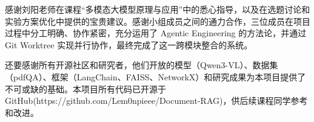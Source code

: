 
\begin{acknowledgements}

感谢刘阳老师在课程``多模态大模型原理与应用''中的悉心指导，以及在选题讨论和实验方案优化中提供的宝贵建议。感谢小组成员之间的通力合作，三位成员在项目过程中分工明确、协作紧密，充分运用了 Agentic Engineering 的方法论，并通过 Git Worktree 实现并行协作，最终完成了这一跨模块整合的系统。

还要感谢所有开源社区和研究者，他们开放的模型（Qwen3-VL）、数据集（pdfQA）、框架（LangChain、FAISS、NetworkX）和研究成果为本项目提供了不可或缺的基础。本项目所有代码已开源于 GitHub(https://github.com/Lem0npieee/Document-RAG)，供后续课程同学参考和改进。

\end{acknowledgements}
